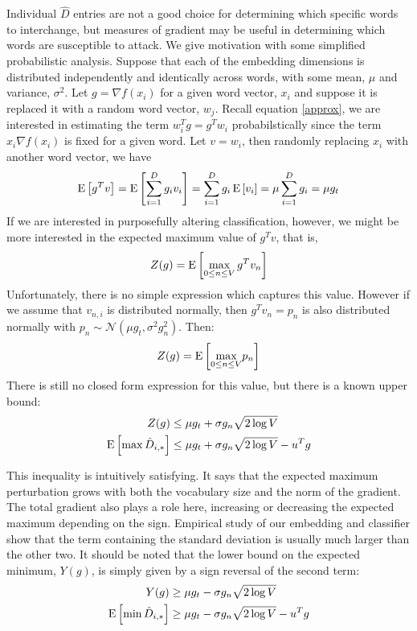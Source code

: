 Individual $\hat{D}$ entries are not a good choice for determining which specific words to interchange, but measures of gradient may be useful in determining which words are susceptible to attack.  We give motivation with some simplified probabilistic analysis.  Suppose that each of the embedding dimensions is distributed independently and identically across words, with some mean, $\mu$ and variance, $\sigma^2$.  Let $g = \nabla f(x_i)$ for a given word vector, $x_i$ and suppose it is replaced it with a random word vector, $w_j$.  Recall equation \ref{approx}, we are interested in estimating the term $w_i^Tg = g^Tw_i$ probabilstically since the term $x_i\nabla f(x_i)$ is fixed for a given word.  Let $v=w_i$, then randomly replacing $x_i$ with another word vector, we have
\begin{equation}
\E{g^Tv} = \E{\sum_{i=1}^D{g_iv_i}} = \sum_{i=1}^D{g_i\E{v_i}} = \mu\sum_{i=1}^D{g_i} = \mu g_t
\end{equation}
\noindent
If we are interested in purposefully altering classification, however, we might be more interested in the expected maximum value of $g^Tv$, that is,
\begin{equation}
Z(g) = \E{\underset{0\leq n\leq V}{\max}\,{g^Tv_n}}
\end{equation}
\noindent
Unfortunately, there is no simple expression which captures this value.  However if we assume that $v_{n,i}$ is distributed normally, then $g^Tv_n = p_n$ is also distributed normally with
$p_n \sim \mathcal{N}(\mu g_t,\sigma^2 g_n^2)$.  Then:
\begin{align}
Z(g) = \E{\underset{0\leq n\leq V}{\max} p_n}
\end{align}
There is still no closed form expression for this value, but there is a known \cite{pm07} upper bound:
\begin{align}
Z(g) &\leq \mu g_t + \sigma g_n\sqrt{2\log{V}}\\
\E{\max \hat{D}_{i,*}} &\leq \mu g_t + \sigma g_n\sqrt{2\log{V}} -u^Tg
\end{align}

\noindent
This inequality is intuitively satisfying.  It says that the expected maximum perturbation grows with both the vocabulary size and the norm of the gradient.  The total gradient also plays a role here, increasing or decreasing the expected maximum depending on the sign.  Empirical study of our embedding and classifier show that the term containing the standard deviation is usually much larger than the other two.  It should be noted that the lower bound on the expected minimum, $Y(g)$, is simply given by a sign reversal of the second term:
\begin{align}
Y(g) &\geq \mu g_t - \sigma g_n\sqrt{2\log{V}} \\
\E{\min \hat{D}_{i,*}} &\geq \mu g_t - \sigma g_n\sqrt{2\log{V}} - u^Tg
\end{align}

